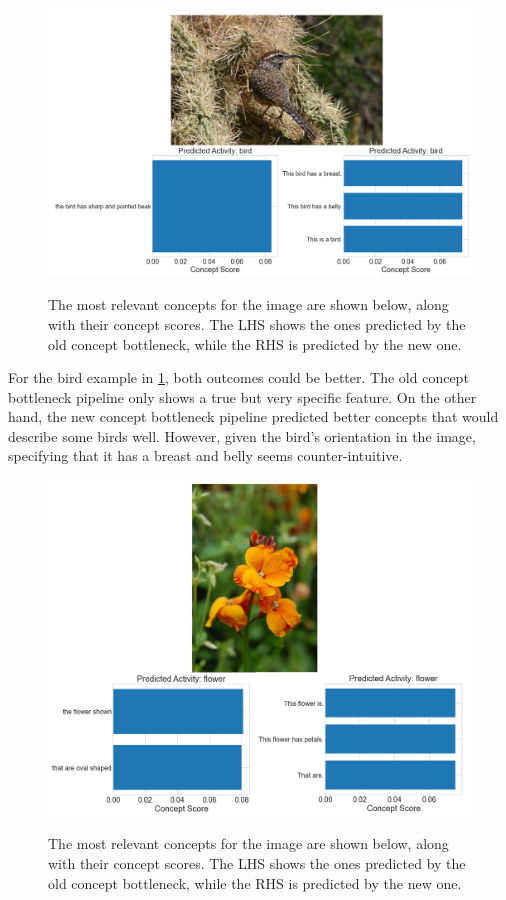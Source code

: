 \begin{figure}[h]
\caption{The most relevant concepts for the image are shown below, along with their concept scores. The LHS shows the ones predicted by the old concept bottleneck, while the RHS is predicted by the new one.}
\centering
\includegraphics[width=\textwidth]{concept-bottleneck-pipeline/birds_predictions.png}
\label{bird-concept-predictions}
\end{figure}

For the bird example in \ref{bird-concept-predictions}, both outcomes could be better.
The old concept bottleneck pipeline only shows a true but very specific feature.
On the other hand, the new concept bottleneck pipeline predicted better concepts that would describe some birds well.
However, given the bird's orientation in the image, specifying that it has a breast and belly seems counter-intuitive.

\begin{figure}[h]
\caption{The most relevant concepts for the image are shown below, along with their concept scores. The LHS shows the ones predicted by the old concept bottleneck, while the RHS is predicted by the new one.}
\centering
\includegraphics[width=\textwidth]{concept-bottleneck-pipeline/flower_predictions.png}
\label{flower-concept-predictions}
\end{figure}

